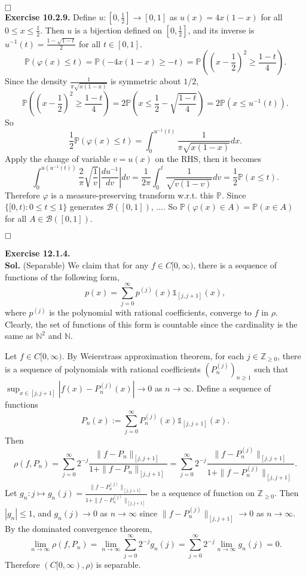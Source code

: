 \documentclass[12pt]{extarticle}
\begin{document}
$\hspace{\fill}\square$
\\
\textbf{Exercise 10.2.9.}
Define $u:\left[0,\frac{1}{2}\right]\rightarrow[0,1]$ as $u(x)=4x(1-x)$ for all $0\leq x\leq\frac{1}{2}$. Then $u$ is a bijection defined on $\left[0,\frac{1}{2}\right]$, and its inverse is $u^{-1}(t)=\frac{1-\sqrt{1-t}}{2}$ for all $t\in[0,1]$.
\[
\mathbb{P}(\varphi(x)\leq t)
=
\mathbb{P}\left(-4x(1-x)\geq -t\right)
=
\mathbb{P}\left(\left(x-\frac{1}{2}\right)^2\geq\frac{1-t}{4}\right).
\]
Since the density $\frac{1}{\pi\sqrt{x(1-x)}}$ is symmetric about $1/2$,
\[
\mathbb{P}\left(\left(x-\frac{1}{2}\right)^2\geq\frac{1-t}{4}\right)
=
2\mathbb{P}\left(x\leq\frac{1}{2}-\sqrt{\frac{1-t}{4}}\right)=2\mathbb{P}\left(x\leq u^{-1}(t)\right).
\]
So
\[
\frac{1}{2}\mathbb{P}\left(\varphi(x)\leq t\right)=\int_0^{u^{-1}(t)}\frac{1}{\pi\sqrt{x(1-x)}}dx.
\]
Apply the change of variable $v=u(x)$ on the RHS, then it becomes
\[
\int_0^{u(u^{-1}(t))}\frac{2}{\pi}\sqrt{\frac{1}{v}}\left|\frac{du^{-1}}{dv}\right|dv
=
\frac{1}{2\pi}\int_0^t\frac{1}{\sqrt{v(1-v)}}dv
=
\frac{1}{2}\mathbb{P}(x\leq t).
\]
Therefore $\varphi$ is a measure-preserving transform w.r.t. this $\mathbb{P}$. Since $\{[0,t):0\leq t\leq 1\}$ generates $\mathcal{B}([0,1])$, .... So $\mathbb{P}(\varphi(x)\in A)=\mathbb{P}(x\in A)$ for all $A\in\mathcal{B}([0,1])$.

$\hspace{\fill}\square$


\newpage
\noindent
{\bf Exercise 12.1.4.} \\
{\bf Sol.} (Separable)
We claim that for any $f\in C[0,\infty)$, there is a sequence of functions of the following form,
\[
p(x)=\sum_{j=0}^\infty p^{(j)}(x)\mathds{1}_{[j,j+1]}(x),
\]
where $p^{(j)}$ is the polynomial with rational coefficients, converge to $f$ in $\rho$.
Clearly, the set of functions of this form is countable since the cardinality is the same as $\mathbb{N}^2$ and $\mathbb{N}$.

Let $f\in C[0,\infty)$.
By Weierstrass approximation theorem, for each $j\in\mathbb{Z}_{\geq 0}$, there is a sequence of polynomials with rational coefficients $(P_n^{(j)})_{n\geq 1}$ such that $\sup_{x\in[j,j+1]}|f(x)-P_n^{(j)}(x)|\rightarrow 0$ as $n\rightarrow\infty$.
Define a sequence of functions
\[
P_n(x):=\sum_{j=0}^\infty P_n^{(j)}(x)\mathds{1}_{[j,j+1]}(x).
\]
Then
\[
\rho(f,P_n)=\sum_{j=0}^\infty 2^{-j}\frac{\|f-P_n\|_{[j,j+1]}}{1+\|f-P_n\|_{[j,j+1]}}
=
\sum_{j=0}^\infty 2^{-j}\frac{\|f-P_n^{(j)}\|_{[j,j+1]}}{1+\|f-P_n^{(j)}\|_{[j,j+1]}}.
\]
Let $g_n:j\mapsto g_n(j)=\frac{\|f-P_n^{(j)}\|_{[j,j+1]}}{1+\|f-P_n^{(j)}\|_{[j,j+1]}}$ be a sequence of function on $\mathbb{Z}_{\geq 0}$.
Then $|g_n|\leq 1$, and $g_n(j)\rightarrow 0$ as $n\rightarrow\infty$ since $\|f-P_n^{(j)}\|_{[j,j+1]}\rightarrow 0$ as $n\rightarrow\infty$. By the dominated convergence theorem,
\[
\lim_{n\rightarrow\infty}\rho(f,P_n)=
\lim_{n\rightarrow\infty}\sum_{j=0}^\infty 2^{-j}g_n(j)
=
\sum_{j=0}^\infty 2^{-j}\lim_{n\rightarrow\infty}g_n(j)=0.
\]
Therefore $(C[0,\infty),\rho)$ is separable. \\
\end{document}
